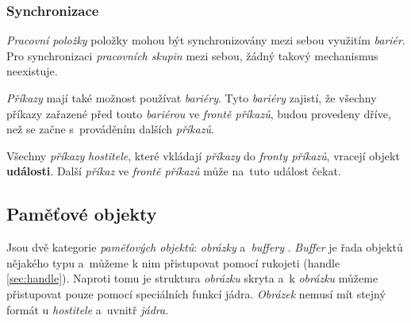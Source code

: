\subsubsection{Synchronizace}

\emph{Pracovní položky} položky mohou být synchronizovány mezi sebou využitím \emph{bariér}. Pro synchronizaci \emph{pracovních skupin} mezi sebou, žádný takový mechanismus neexistuje.

\emph{Příkazy} mají také možnost používat \emph{bariéry}. Tyto \emph{bariéry} zajistí, že všechny příkazy zařazené před touto \emph{bariérou} ve \emph{frontě příkazů}, budou provedeny dříve, než se začne s~prováděním dalších \emph{příkazů}.

Všechny \emph{příkazy} \emph{hostitele}, které  vkládají \emph{příkazy} do \emph{fronty příkazů}, vracejí objekt \textbf{události}. Další \emph{příkaz} ve \emph{frontě příkazů} může na~tuto událost čekat.

\subsection{Paměťové objekty}

Jsou dvě kategorie \emph{paměťových objektů}: \emph{obrázky}  a~\emph{buffery} .
\emph{Buffer} je řada objektů nějakého typu a~můžeme k nim přistupovat pomocí rukojeti (handle \ref{sec:handle}). Naproti tomu je struktura \emph{obrázku} skryta a~k \emph{obrázku} můžeme přistupovat pouze pomocí speciálních funkcí jádra. \emph{Obrázek} nemusí mít stejný formát u \emph{hostitele} a~uvnitř \emph{jádra}.



